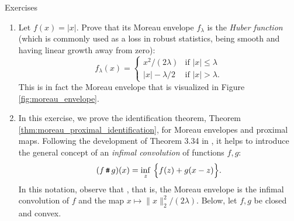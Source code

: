 \begin{xcb}{Exercises}
\begin{enumerate}[label=\thechapter.\arabic*]
\begin{enumerate}[label=\alph*.]
\item Show that $f$ and $f_\lambda$ have the same minimizers
  \eqref{eq:moreau_envelope_argmin}. Hint: use \eqref{eq:moreau_envelope_prox}
  and the proximal optimality condition \eqref{eq:proximal_optimality}. 

\item Show that if $f_\lambda$ were differentiable, then its gradient must be as
  in \eqref{eq:moreau_envelope_gradient}, by using the subgradient rule for a
  partial infimum in Property .   

\item Now prove that $f_\lambda$ is differentiable with gradient as given in
  \eqref{eq:moreau_envelope_gradient}. Hint: abbreviating $f_x = f_\lambda(x)$
  and $z_x = \prox_{\lambda f}(x)$, simply verify the definition of
  differentiability directly: 
  \[
  \lim_{y \to x} \frac{f_y - f_x - (y - x)^\T (x - z_x) / \lambda}{\|y-x\|_2^2} 
  = 0.
  \]
  To check this, use \eqref{eq:moreau_envelope_prox} and direct algebra to argue 
  that $f_y - f_x \geq (y - x)^\T (x - z_x) / \lambda$; by swapping the roles of
  $x$ and $y$, argue that also $f_y - f_x \leq (y - x)^\T (y - z_y) / \lambda$. 
  These two inequalities can be used in combination to verify the
  differentiability condition.     
\end{enumerate}

\item Let $f(x) = |x|$. Prove that its Moreau envelope $f_\lambda$ is the 
  \emph{Huber function} (which is commonly used as a loss in robust statistics,
  being smooth and having linear growth away from zero): 
  \[
  f_\lambda(x) = 
  \begin{cases}
  x^2/ (2\lambda) & \text{if $|x| \leq \lambda$} \\
  |x| - \lambda/2 & \text{if $|x| > \lambda$}.
  \end{cases}
  \]
  This is in fact the Moreau envelope that is visualized in Figure
  \ref{fig:moreau_envelope}.  

\item \label{ex:moreau_proximal_identification}
  In this exercise, we prove the identification theorem, Theorem
  \ref{thm:moreau_proximal_identification}, for Moreau envelopes and proximal
  maps. Following the development of Theorem 3.34 in
  \cite{rockafellar2009variational}, it helps to introduce the general concept 
  of an \emph{infimal convolution} of functions $f,g$: 
  \[
  (f \operatorname{\texttt{\#}} g)(x) = \inf_z \, \Big\{ f(z) + g(x-z) \Big\}.
  \]
  In this notation, observe that , that is, the Moreau envelope is the infimal convolution of $f$
  and the map $x \mapsto \|x\|_2^2 /  (2\lambda)$. Below, let $f,g$ be closed
  and convex.   


\end{enumerate}
\end{xcb}
